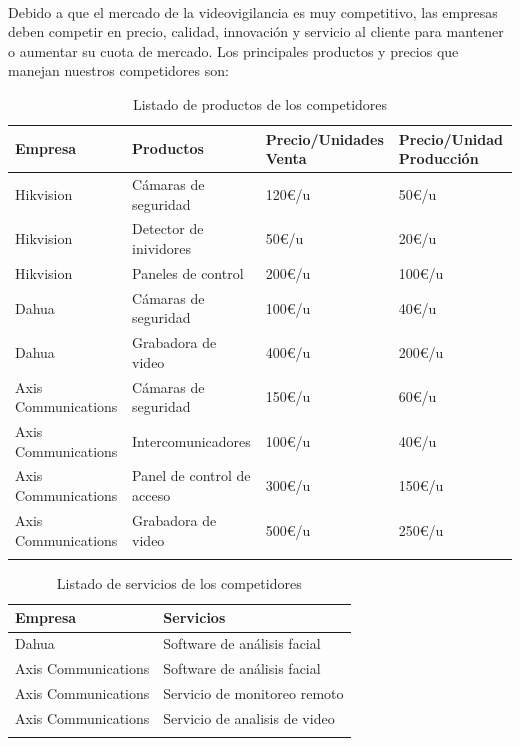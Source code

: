 \documentclass{report}
\begin{document}
        \paragraph*{}{
          Debido a que el mercado de la videovigilancia es muy competitivo, las empresas deben competir en precio, calidad, innovación y servicio al cliente para mantener o aumentar su cuota de mercado.
          Los principales productos y precios que manejan nuestros competidores son:
        }
        \begin{longtable}{|p{4cm}|p{5cm}|p{3cm}|p{3cm}|}
          \hline
          \textbf{Empresa} & \textbf{Productos} & \textbf{Precio/Unidades Venta} & \textbf{Precio/Unidad Producción}\\
          \hline
          \hline
          Hikvision & Cámaras de seguridad & 120€/u & 50€/u\\
          \hline
          Hikvision & Detector de inividores & 50€/u & 20€/u\\
          \hline
          Hikvision & Paneles de control & 200€/u & 100€/u\\
          \hline
          Dahua & Cámaras de seguridad & 100€/u & 40€/u\\
          \hline
          Dahua & Grabadora de video & 400€/u & 200€/u\\
          \hline
          Axis Communications & Cámaras de seguridad & 150€/u & 60€/u\\
          \hline
          Axis Communications & Intercomunicadores & 100€/u & 40€/u\\
          \hline
          Axis Communications & Panel de control de acceso & 300€/u & 150€/u\\
          \hline
          Axis Communications & Grabadora de video & 500€/u & 250€/u\\
          \hline
          \caption{Listado de productos de los competidores}
        \end{longtable}
        \begin{longtable}{|p{5cm}|p{11cm}|}
          \hline
          \textbf{Empresa} & \textbf{Servicios}\\
          \hline
          \hline
          Dahua & Software de análisis facial\\
          \hline
          Axis Communications & Software de análisis facial\\
          \hline
          Axis Communications & Servicio de monitoreo remoto\\
          \hline
          Axis Communications & Servicio de analisis de video\\
          \hline
          \caption{Listado de servicios de los competidores}
        \end{longtable}
\end{document}
